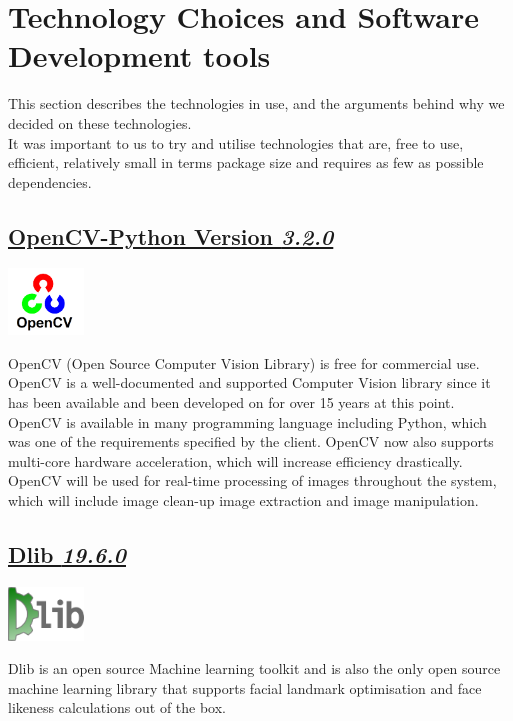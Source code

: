 \documentclass{article}
\begin{document}
		\section{Technology Choices and Software Development tools}
		This section describes the technologies in use, and the
		arguments behind why we decided on these technologies.\\
		It was important to us to try and utilise technologies that are,
		free to use, efficient, relatively small in terms package size and
		requires as few as possible dependencies.
		

		\begin{minipage}[b]{0.50\linewidth}
		\subsection{ 	
			\href{https://github.com/skvark/opencv-python}	{OpenCV-Python Version \textit{3.2.0}}}
		\vspace{5mm}
		\end{minipage}
		\begin{minipage}[b]{0.50\linewidth}
			\includegraphics[width=2.0cm]{img/opencv-logo.png}
		\end{minipage}
		OpenCV (Open Source Computer Vision Library) is free for commercial use.
		OpenCV is a well-documented and supported Computer Vision library
		since it has been available and been developed on for over 15 years at this point.
		OpenCV is available in many programming language 
		including Python, which was one of the requirements specified by the client.
		OpenCV now also supports multi-core hardware acceleration, which will
		increase efficiency drastically. \\

		\noindent
		OpenCV will be used for real-time processing of images throughout the system,
		which will include image clean-up image extraction and image manipulation.\\
		
		\begin{minipage}[b]{0.25\linewidth}
		\subsection{\href{http://dlib.net/}{Dlib \textit{19.6.0}}}
		\vspace{5mm}
		\end{minipage}
		\begin{minipage}[b]{0.75\linewidth}
			\includegraphics[width=2.0cm]{img/Dlib.png}
		\end{minipage}
		Dlib is an open source Machine learning toolkit and is also
		the only open source machine learning library that supports facial landmark
		optimisation and face likeness calculations out of the box.\\ 
\end{document}
